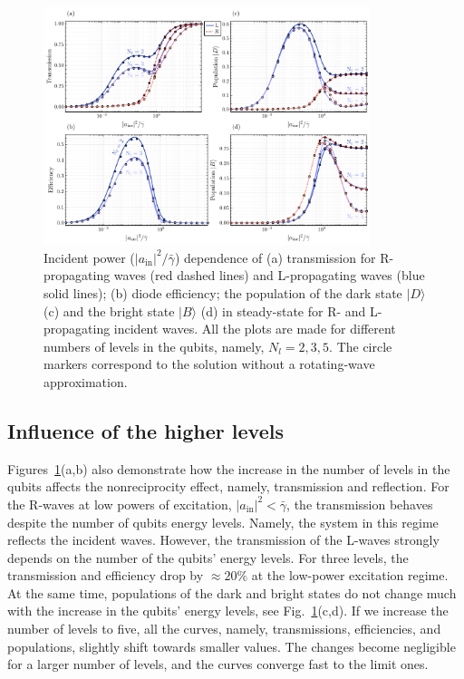 \documentclass[lettersize,journal]{IEEEtran}
\begin{document}
\begin{figure}[t]
    \centering
    \includegraphics[width=0.85\textwidth]{fig_3_delta-0.15}
    \caption{Incident power ($|a_\mathrm{in}|^2 / \bar{\gamma}$) dependence of (a) transmission for R-propagating waves (red dashed lines) and L-propagating waves (blue solid lines); (b) diode efficiency; the population of the dark state $|D\rangle$ (c) and the bright state $|B\rangle$ (d) in steady-state for R- and L-propagating incident waves. All the plots are made for different numbers of levels in the qubits, namely, $N_l = 2, 3, 5$. The circle markers correspond to the solution without a rotating-wave approximation.}
    \label{fig:03}
\end{figure}

\subsection{Influence of the higher levels}

Figures~\ref{fig:03}(a,b) also demonstrate how the increase in the number of levels in the qubits affects the nonreciprocity effect, namely, transmission and reflection.
For the R-waves at low powers of excitation, $|a_\mathrm{in}|^2 < \bar{\gamma}$, the transmission behaves despite the number of qubits energy levels.
Namely, the system in this regime reflects the incident waves.
However, the transmission of the L-waves strongly depends on the number of the qubits' energy levels.
For three levels, the transmission and efficiency drop by $\approx 20 \%$ at the low-power excitation regime.
At the same time, populations of the dark and bright states do not change much with the increase in the qubits' energy levels, see Fig.~\ref{fig:03}(c,d).
If we increase the number of levels to five, all the curves, namely, transmissions, efficiencies, and populations, slightly shift towards smaller values.
The changes become negligible for a larger number of levels, and the curves converge fast to the limit ones.
\end{document}
